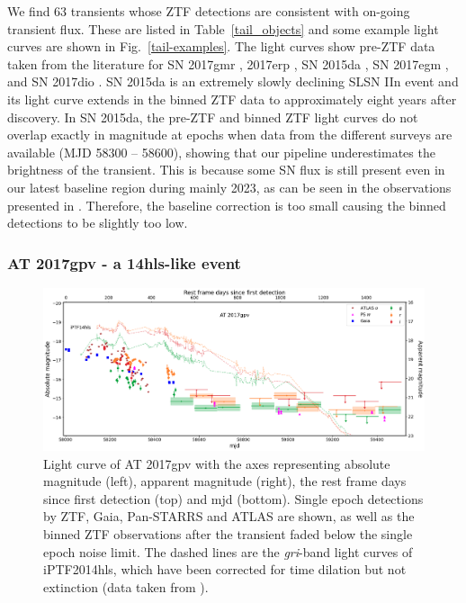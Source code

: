 \documentclass[a4paper,oneside,12pt, class=Latex/Classes/PhDthesisPSnPDF, crop=false]{standalone}
\begin{document}
We find 63 transients whose ZTF detections are consistent with on-going transient flux. These are listed in Table~\ref{tail_objects} and some example light curves are shown in Fig.~\ref{tail-examples}. The light curves show pre-ZTF data taken from the literature for  SN 2017gmr \cite[][]{2017gmr},  2017erp \cite[][]{2017erp}, SN 2015da \cite[][]{2015da_2020}, SN 2017egm \cite[][]{2017egm}, and SN 2017dio \cite[][]{2017dio}. SN 2015da is an extremely slowly declining SLSN IIn event \citep{2015da_2020, 2015da_2024} and its light curve extends in the binned ZTF data to approximately eight years after discovery. In SN 2015da, the pre-ZTF and binned ZTF light curves do not overlap exactly in magnitude at epochs when data from the different surveys are available (MJD 58300 -- 58600), showing that our pipeline underestimates the brightness of the transient. This is because some SN flux is still present even in our latest baseline region during mainly 2023, as can be seen in the observations presented in \citet{2015da_2024}. Therefore, the baseline correction is too small causing the binned detections to be slightly too low.


\subsubsection{AT 2017gpv - a 14hls-like event}
\begin{figure}
    \centering
    \includegraphics[width=\textwidth]{../Images/chapter_4/17gpv.png}
    \caption{Light curve of AT 2017gpv with the axes representing absolute magnitude (left), apparent magnitude (right), the rest frame days since first detection (top) and mjd (bottom). Single epoch detections by ZTF, Gaia, Pan-STARRS and ATLAS are shown, as well as the binned ZTF observations after the transient faded below the single epoch noise limit. The dashed lines are the \textit{gri}-band light curves of iPTF2014hls, which have been corrected for time dilation but not extinction (data taken from \citealt{iPTF14hls_Iair, Sollerman_2019_iptf14hls}).}
    \label{17gpv_plot}
\end{figure}
\end{document}
